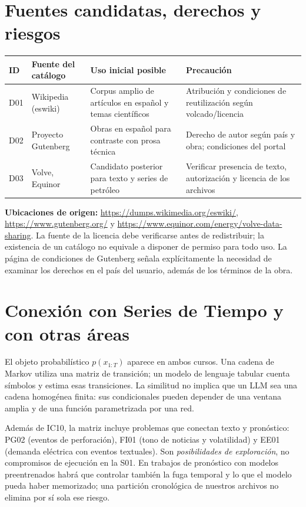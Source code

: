 \section*{Fuentes candidatas, derechos y riesgos}
\begin{center}\small
\begin{tabularx}{\linewidth}{@{}p{1.2cm}p{3.3cm}Xp{2.6cm}@{}}\toprule
ID & Fuente del catálogo & Uso inicial posible & Precaución\\\midrule
D01 & Wikipedia (eswiki) & Corpus amplio de artículos en español y temas científicos & Atribución y condiciones de reutilización según volcado/licencia\\
D02 & Proyecto Gutenberg & Obras en español para contraste con prosa técnica & Derecho de autor según país y obra; condiciones del portal\\
D03 & Volve, Equinor & Candidato posterior para texto y series de petróleo & Verificar presencia de texto, autorización y licencia de los archivos\\\bottomrule
\end{tabularx}
\end{center}
\textbf{Ubicaciones de origen:} \url{https://dumps.wikimedia.org/eswiki/},
\url{https://www.gutenberg.org/} y
\url{https://www.equinor.com/energy/volve-data-sharing}.
La fuente de la licencia debe verificarse antes de redistribuir; la existencia
de un catálogo no equivale a disponer de permiso para todo uso. La página de
condiciones de Gutenberg señala explícitamente la necesidad de examinar los
derechos en el país del usuario, además de los términos de la obra.

\section*{Conexión con Series de Tiempo y con otras áreas}
El objeto probabilístico $p(x_{1:T})$ aparece en ambos cursos. Una cadena de
Markov utiliza una matriz de transición; un modelo de lenguaje tabular cuenta
símbolos y estima esas transiciones. La similitud no implica que un LLM sea una
cadena homogénea finita: sus condicionales pueden depender de una ventana amplia
y de una función parametrizada por una red.

Además de IC10, la matriz incluye problemas que conectan texto y pronóstico:
PG02 (eventos de perforación), FI01 (tono de noticias y volatilidad) y EE01
(demanda eléctrica con eventos textuales). Son \emph{posibilidades de exploración},
no compromisos de ejecución en la S01. En trabajos de pronóstico con modelos
preentrenados habrá que controlar también la fuga temporal y lo que el modelo
pueda haber memorizado; una partición cronológica de nuestros archivos no elimina
por sí sola ese riesgo.

